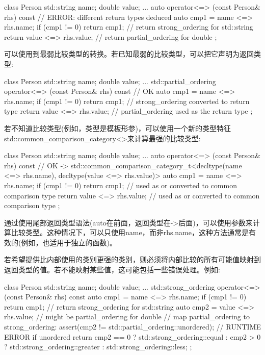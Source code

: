 \begin{cpp}
class Person {
	std::string name;
	double value;
	...
	auto operator<=> (const Person& rhs) const { // ERROR: different return types deduced
		auto cmp1 = name <=> rhs.name;
		if (cmp1 != 0) return cmp1; // return strong_ordering for std::string
		return value <=> rhs.value; // return partial_ordering for double
	}
};
\end{cpp}

可以使用到最弱比较类型的转换。若已知最弱的比较类型，可以把它声明为返回类型:

\begin{cpp}
class Person {
	std::string name;
	double value;
	...
	std::partial_ordering operator<=> (const Person& rhs) const { // OK
		auto cmp1 = name <=> rhs.name;
		if (cmp1 != 0) return cmp1; // strong_ordering converted to return type
		return value <=> rhs.value; // partial_ordering used as the return type
	}
};
\end{cpp}

若不知道比较类型(例如，类型是模板形参)，可以使用一个新的类型特征std::common\_comparison\_category<>来计算最强的比较类型:

\begin{cpp}
class Person {
	std::string name;
	double value;
	...
	auto operator<=> (const Person& rhs) const // OK
	-> std::common_comparison_category_t<decltype(name <=> rhs.name),
										 decltype(value <=> rhs.value)> {
		auto cmp1 = name <=> rhs.name;
		if (cmp1 != 0) return cmp1; // used as or converted to common comparison type
		return value <=> rhs.value; // used as or converted to common comparison type
	}
};
\end{cpp}

通过使用尾部返回类型语法(auto在前面，返回类型在->后面)，可以使用参数来计算比较类型。这种情况下，可以只使用name，而非rhs.name，这种方法通常是有效的(例如，也适用于独立的函数)。

若希望提供比内部使用的类别更强的类别，则必须将内部比较的所有可能值映射到返回类型的值。若不能映射某些值，这可能包括一些错误处理。例如:

\begin{cpp}
class Person {
	std::string name;
	double value;
	...
	std::strong_ordering operator<=> (const Person& rhs) const {
		auto cmp1 = name <=> rhs.name;
		if (cmp1 != 0) return cmp1; // return strong_ordering for std::string
		auto cmp2 = value <=> rhs.value; // might be partial_ordering for double
		// map partial_ordering to strong_ordering:
		assert(cmp2 != std::partial_ordering::unordered); // RUNTIME ERROR if unordered
		return cmp2 == 0 ? std::strong_ordering::equal
		                 : cmp2 > 0 ? std::strong_ordering::greater
		                            : std::strong_ordering::less;
	}
};
\end{cpp}

